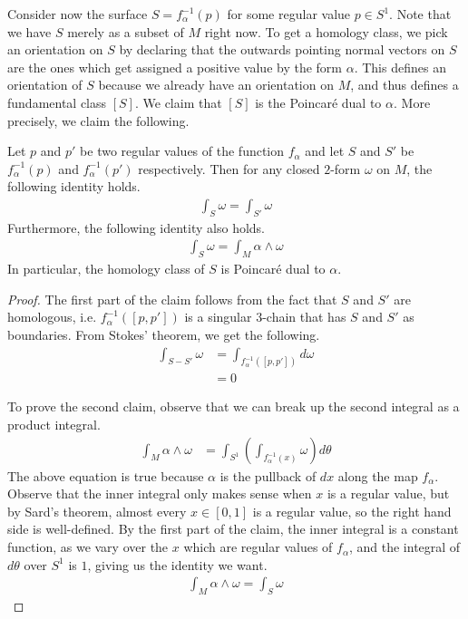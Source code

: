 Consider now the surface $S = f_{\alpha}^{-1}(p)$ for some regular value $p \in S^1$. Note that we have
$S$ merely as a subset of $M$ right now. To get a homology class, we pick an orientation on $S$ by declaring
that the outwards pointing normal vectors on $S$ are the ones which get assigned a positive value by the form
$\alpha$. This defines an orientation of $S$ because we already have an orientation on $M$, and thus defines a
fundamental class $[S]$. We claim that $[S]$ is the Poincar\'e dual to $\alpha$. More precisely, we claim the
following.
\begin{claim}
  Let $p$ and $p'$ be two regular values of the function $f_{\alpha}$ and let $S$ and $S'$ be
  $f_{\alpha}^{-1}(p)$ and $f^{-1}_{\alpha}(p')$ respectively. Then for any closed $2$-form $\omega$ on $M$,
  the following identity holds.
  \begin{align*}
    \int_{S} \omega = \int_{S'} \omega
  \end{align*}
  Furthermore, the following identity also holds.
  \begin{align*}
    \int_S \omega = \int_M \alpha \wedge \omega
  \end{align*}
  In particular, the homology class of $S$ is Poincar\'e dual to $\alpha$.
\end{claim}
\begin{proof}
  The first part of the claim follows from the fact that $S$ and $S'$ are homologous,
  i.e. $f^{-1}_{\alpha}([p, p'])$ is a singular $3$-chain that has $S$ and $S'$ as boundaries. From Stokes'
  theorem, we get the following.
  \begin{align*}
    \int_{S - S'} \omega &= \int_{f_{\alpha}^{-1}([p, p'])} d\omega \\
                         &= 0
  \end{align*}

  To prove the second claim, observe that we can break up the second integral as a product integral.
  \begin{align*}
    \int_M \alpha \wedge \omega &= \int_{S^1} \left(   \int_{f_{\alpha}^{-1}(x)} \omega \right) d\theta
  \end{align*}
  The above equation is true because $\alpha$ is the pullback of $dx$ along the map $f_{\alpha}$. Observe
  that the inner integral only makes sense when $x$ is a regular value, but by Sard's theorem, almost
  every $x \in [0,1]$ is a regular value, so the right hand side is well-defined. By the first part of the
  claim, the inner integral is a constant function, as we vary over the $x$ which are regular values of $f_{\alpha}$,
  and the integral of $d\theta$ over $S^1$ is $1$, giving us the identity we want.
  \begin{align*}
    \int_M \alpha \wedge \omega = \int_S \omega
  \end{align*}
\end{proof}
